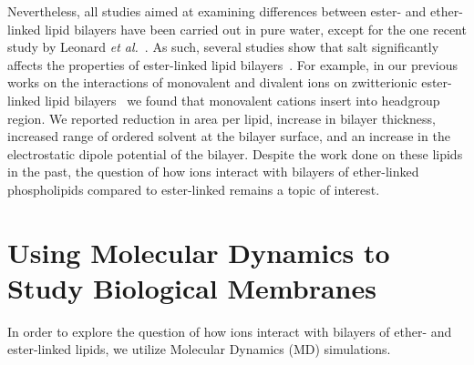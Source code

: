 \documentclass[12pt,openany,final]{book}
\newcommand{\etal}{\textit{et al.}}
\begin{document}
Nevertheless, all studies aimed at examining differences between ester- and ether-linked lipid bilayers have been carried out in pure water, except for the one recent study by 
Leonard \etal~\cite{leonard:2018}. As such, several studies show that salt significantly 
affects the properties of ester-linked lipid bilayers~\cite{kruczek:2019,kruczek:2017, duro:2016,pabst:2007,sachs:2004,petrache:2006:swelling}. 
For example, in our previous works on the interactions of monovalent and divalent ions on zwitterionic ester-linked lipid bilayers~\cite{kruczek:2019,kruczek:2017}
we found that monovalent cations insert into headgroup region. 
We reported reduction in area per lipid, increase in  bilayer thickness, increased range of ordered solvent at the bilayer surface, and an increase in
the electrostatic dipole potential of the bilayer.
Despite the work done on these lipids in the past, the question of how ions interact with bilayers of ether-linked
phospholipids compared to ester-linked remains a topic of interest.



\section{Using Molecular Dynamics to Study Biological Membranes}
In order to explore the question of how ions interact with bilayers of ether- and ester-linked lipids, we utilize 
Molecular Dynamics (MD) simulations.
\end{document}
